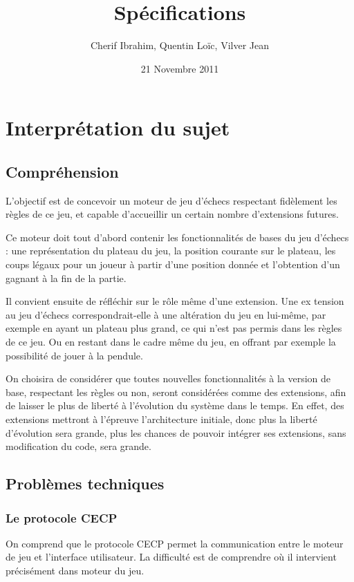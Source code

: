 \documentclass[11pt]{article}
\title{Spécifications}
\author{Cherif Ibrahim, Quentin Loïc, Vilver Jean}
\date{21 Novembre 2011}
\begin{document}
\maketitle

\setcounter{tocdepth}{3}
\tableofcontents
\vspace*{1cm}

\section{Interprétation du sujet}
\label{sec-1}
\subsection{Compréhension}
\label{sec-1-1}
L'objectif est de concevoir un moteur de jeu d'échecs respectant fidèlement les règles de ce jeu, et capable d'accueillir un certain nombre d'extensions futures.

Ce moteur doit tout d'abord contenir les fonctionnalités de bases du jeu d'échecs : une représentation du plateau du jeu, la position courante sur le plateau, les coups légaux pour un joueur à partir d'une position donnée et l'obtention d'un gagnant à la fin de la partie.
   
Il convient ensuite de réfléchir sur le rôle même d'une extension. Une ex tension au jeu d'échecs correspondrait-elle à une altération du jeu en lui-même, par exemple en ayant un plateau plus grand, ce qui n'est pas permis dans les règles de ce jeu. Ou en restant dans le cadre même du jeu, en offrant par exemple la possibilité de jouer à la pendule.
   
On choisira de considérer que toutes nouvelles fonctionnalités à la version de base, respectant les règles ou non, seront considérées comme des extensions, afin de laisser le plus de liberté à l'évolution du système dans le temps. 
En effet, des extensions mettront à l'épreuve l'architecture initiale, donc plus la liberté d'évolution sera grande, plus les chances de pouvoir intégrer ses extensions, sans modification du code, sera grande.
\subsection{Problèmes techniques}
\label{sec-1-2}
\subsubsection{Le protocole CECP}
\label{sec-1-2-1}
On comprend que le protocole CECP permet la communication entre le moteur de jeu et l'interface utilisateur. La difficulté est de comprendre où il intervient précisément dans moteur du jeu.
\end{document}
